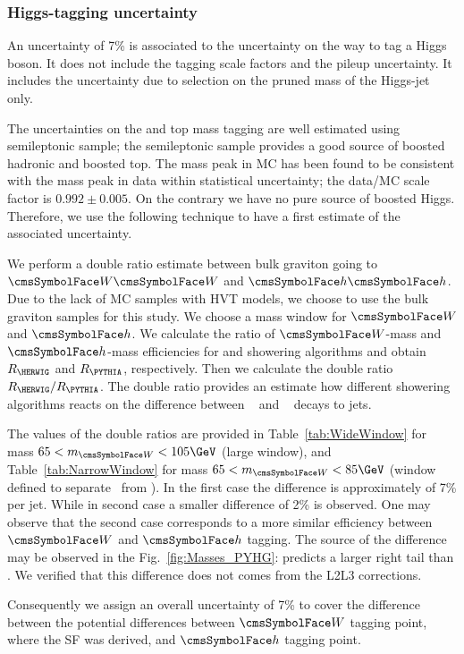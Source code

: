 \subsubsection*{Higgs-tagging uncertainty}
 An uncertainty of 7\% is associated to the uncertainty on the way to tag a 
Higgs boson. It does not include the \PQb tagging scale factors and the pileup uncertainty. It includes 
the uncertainty due to selection on the pruned mass of the Higgs-jet only. 

The uncertainties on the \PW and top mass tagging are well estimated using 
semileptonic \ttbar sample; the semileptonic \ttbar sample provides a good 
source of boosted hadronic \PW and boosted top. The \PW mass peak in MC 
has been found to be consistent with the mass peak in data 
within statistical uncertainty; the data/MC scale factor is 
$0.992\pm0.005$. On the contrary we have no 
pure source of boosted Higgs. Therefore, we use the following technique to have 
a first estimate of the associated uncertainty. 


We perform a double ratio estimate between bulk graviton going to 
$\PW\PW$ and $\Ph\Ph$. Due to the lack of \HERWIGpp MC samples with HVT models, 
we choose to use the bulk graviton samples for this study. 
%
We choose a mass window for $\PW$ and $\Ph$. We calculate the ratio of 
$\PW$-mass and $\Ph$-mass efficiencies for \PYTHIA and \HERWIG showering algorithms 
and obtain $R_{\HERWIG}$ and $R_{\PYTHIA}$, respectively. Then we calculate 
the double ratio $R_{\HERWIG}/R_{\PYTHIA}$. The 
double ratio provides an estimate how different showering algorithms reacts on 
the difference between \PW~ and \Ph~ decays to jets. 

The values of the double ratios are provided in 
Table~\ref{tab:WideWindow} for \PW~ mass $65 < m_{\PW} <105\GeV$ 
(large window), and Table~\ref{tab:NarrowWindow} for \PW mass 
$65 < m_{\PW} <85\GeV$ (window defined to separate \PW~from \PZz). 
In the first case the difference is approximately of 7\% per jet. While in 
second case a smaller difference of 2\% is observed. One may observe
that the second case corresponds to a more similar efficiency between
$\PW$ and $\Ph$ tagging. 
The source of the difference may be observed in the Fig.~\ref{fig:Masses_PYHG}: 
\HERWIG predicts a larger right tail than \PYTHIA. We verified that this 
difference does not comes from the L2L3 corrections.

Consequently we assign an overall 
uncertainty of 7\% to cover the difference between the potential differences 
between $\PW$ tagging point, where the SF was derived, and $\Ph$ tagging point.

